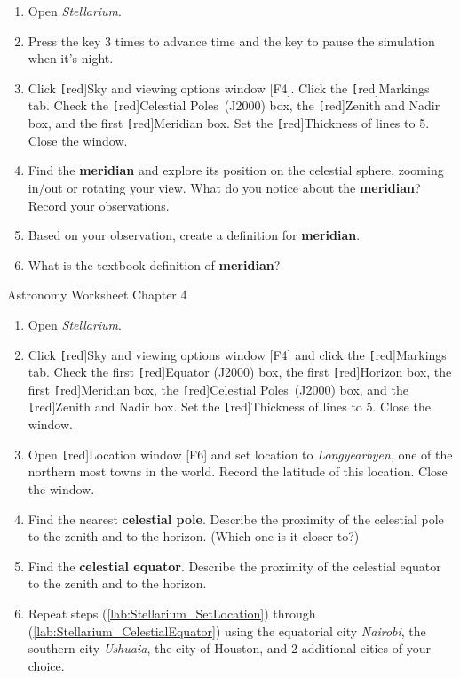 \documentclass{article}
\newcounter{mycounter}
\begin{document}
\begin{enumerate}
\setlength\itemsep{0pt}
    \item Open \textit{Stellarium}.
    \item Press the  key 3 times to advance time and the  key to pause the simulation when it's night.
    \item Click \texttt[red]{Sky and viewing options window [F4]}. Click the \texttt[red]{Markings} tab. Check the \texttt[red]{Celestial Poles~(J2000)} box, the \texttt[red]{Zenith and Nadir} box, and the first \texttt[red]{Meridian} box. Set the \texttt[red]{Thickness} of lines to 5. Close the window.
    \item Find the \textbf{meridian} and explore its position on the celestial sphere, zooming in/out or rotating your view. What do you notice about the \textbf{meridian}? Record your observations.
    \item Based on your observation, create a definition for \textbf{meridian}.
    \item What is the textbook definition of \textbf{meridian}?
\end{enumerate}

\clearpage


Astronomy \hfill Worksheet \themycounter \hfill Chapter 4

\begin{enumerate}
\setlength\parskip{0pt}
    \item Open \textit{Stellarium}.
    \item Click \texttt[red]{Sky and viewing options window [F4]} and click the \texttt[red]{Markings} tab. Check the first \texttt[red]{Equator (J2000)} box, the first \texttt[red]{Horizon} box, the first \texttt[red]{Meridian} box, the \texttt[red]{Celestial Poles~(J2000)} box, and the \texttt[red]{Zenith and Nadir} box. Set the \texttt[red]{Thickness} of lines to 5. Close the window.
    \item \label{lab:Stellarium_SetLocation} Open \texttt[red]{Location window [F6]} and set location to \textit{Longyearbyen}, one of the northern most towns in the world. Record the latitude of this location. Close the window. 
    \item  Find the nearest \textbf{celestial pole}. Describe the proximity of the celestial pole to the zenith and to the horizon. (Which one is it closer to?)
    \item \label{lab:Stellarium_CelestialEquator} Find the \textbf{celestial equator}. Describe the proximity of the celestial equator to the zenith and to the horizon.
    \item Repeat steps (\ref{lab:Stellarium_SetLocation}) through (\ref{lab:Stellarium_CelestialEquator}) using the equatorial city \textit{Nairobi}, the southern city \textit{Ushuaia}, the city of Houston, and 2 additional cities of your choice. 
\end{enumerate}
\end{document}
